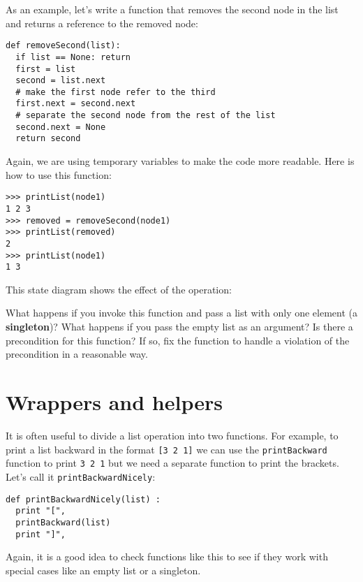 As an example, let's write a function that removes the second
node in the list and returns a reference to the removed node:

\beforeverb
\begin{verbatim}
def removeSecond(list):
  if list == None: return
  first = list
  second = list.next
  # make the first node refer to the third
  first.next = second.next
  # separate the second node from the rest of the list
  second.next = None
  return second
\end{verbatim}
\afterverb
%
Again, we are using temporary variables to make the code more
readable.  Here is how to use this function:

\beforeverb
\begin{verbatim}
>>> printList(node1)
1 2 3
>>> removed = removeSecond(node1)
>>> printList(removed)
2
>>> printList(node1)
1 3
\end{verbatim}
\afterverb
%
This state diagram shows the effect of the operation:

\beforefig
\centerline{}
\afterfig

What happens if you invoke this function and pass a list with only one
element (a {\bf singleton})?  What happens if you pass the empty list
as an argument?  Is there a precondition for this function?  If so, fix
the function to handle a violation of the precondition in a reasonable
way.



\section{Wrappers and helpers}

It is often useful to divide a list operation into
two functions.  For example, to print a list
backward in the
format {\tt [3 2 1]} we can use the
{\tt printBackward} function to print {\tt 3 2 1} but we need
a separate function to print the brackets.
Let's call it {\tt printBackwardNicely}:

\beforeverb
\begin{verbatim}
def printBackwardNicely(list) :
  print "[",
  printBackward(list)
  print "]",
\end{verbatim}
\afterverb
%
Again, it is a good idea to check functions like this to see
if they work with special cases like an empty list or
a singleton.


